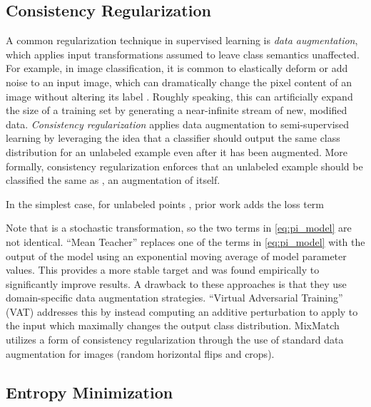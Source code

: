 \documentclass{article}
\begin{document}
\subsection{Consistency Regularization}
\label{sec:consistency}

A common regularization technique in supervised learning is \textit{data augmentation}, which applies input transformations assumed to leave class semantics unaffected.
For example, in image classification, it is common to elastically deform or add noise to an input image, which can dramatically change the pixel content of an image without altering its label \cite{ciresan2010deep,simard2003best,cubuk2018autoaugment}.
Roughly speaking, this can artificially expand the size of a training set by generating a near-infinite stream of new, modified data.
\textit{Consistency regularization} applies data augmentation to semi-supervised learning by leveraging the idea that a classifier should output the same class distribution for an unlabeled example even after it has been augmented.
More formally, consistency regularization enforces that an unlabeled example  should be classified the same as , an augmentation of itself.

In the simplest case, for unlabeled points , prior work \cite{laine2016temporal,sajjadi2016regularization} adds the loss term

Note that  is a stochastic transformation, so the two terms in \cref{eq:pi_model} are not identical.
``Mean Teacher'' \cite{tarvainen2017weight} replaces one of the terms in \cref{eq:pi_model} with the output of the model using an exponential moving average of model parameter values.
This provides a more stable target and was found empirically to significantly improve results.
A drawback to these approaches is that they use domain-specific data augmentation strategies.
``Virtual Adversarial Training'' \cite{miyato2018virtual} (VAT) addresses this by instead computing an additive perturbation to apply to the input which maximally changes the output class distribution.
MixMatch utilizes a form of consistency regularization through the use of standard data augmentation for images (random horizontal flips and crops).

\subsection{Entropy Minimization}
\label{sec:entmin}
\end{document}

